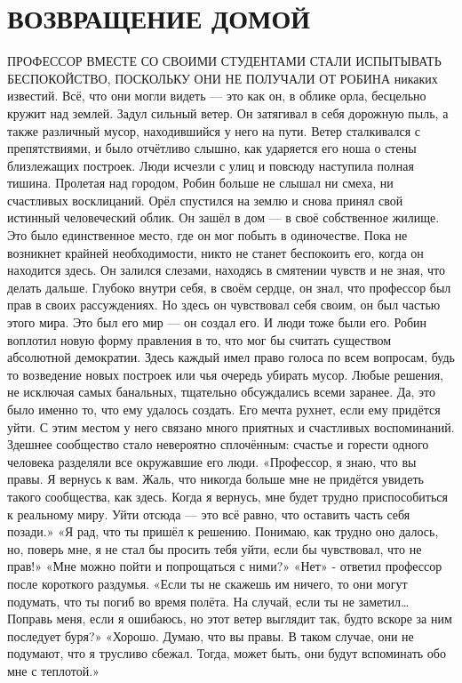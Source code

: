 \documentclass[a4paper,12pt]{book}
\begin{document}
\chapter{ВОЗВРАЩЕНИЕ ДОМОЙ}
	ПРОФЕССОР ВМЕСТЕ СО СВОИМИ СТУДЕНТАМИ СТАЛИ ИСПЫТЫВАТЬ БЕСПОКОЙСТВО, ПОСКОЛЬКУ ОНИ НЕ ПОЛУЧАЛИ ОТ РОБИНА никаких известий. Всё, что они могли видеть — это как он, в облике орла, бесцельно кружит над землей.
	Задул сильный ветер. Он затягивал в себя дорожную пыль, а также различный мусор, находившийся у него на пути. Ветер сталкивался с препятствиями, и было отчётливо слышно, как ударяется его ноша о стены близлежащих построек.
	Люди исчезли с улиц и повсюду наступила полная тишина. Пролетая над городом, Робин больше не слышал ни смеха, ни счастливых восклицаний.
	Орёл спустился на землю и снова принял свой истинный человеческий облик. Он зашёл в дом — в своё собственное жилище. Это было единственное место, где он мог побыть в одиночестве. Пока не возникнет крайней необходимости, никто не станет беспокоить его, когда он находится здесь.
	Он залился слезами, находясь в смятении чувств и не зная, что делать дальше. Глубоко внутри себя, в своём сердце, он знал, что профессор был прав в своих рассуждениях. Но здесь он чувствовал себя своим, он был частью этого мира. Это был его мир — он создал его. И люди тоже были его. Робин воплотил новую форму правления в то, что мог бы считать существом абсолютной демократии. Здесь каждый имел право голоса по всем вопросам, будь то возведение новых построек или чья очередь убирать мусор. Любые решения, не исключая самых банальных, тщательно обсуждались всеми заранее. Да, это было именно то, что ему удалось создать. Его мечта рухнет, если ему придётся уйти.
	С этим местом у него связано много приятных и счастливых воспоминаний. Здешнее сообщество стало невероятно сплочённым: счастье и горести одного человека разделяли все окружавшие его люди.
	«Профессор, я знаю, что вы правы. Я вернусь к вам. Жаль, что никогда больше мне не придётся увидеть такого сообщества, как здесь. Когда я вернусь, мне будет трудно приспособиться к реальному миру. Уйти отсюда — это всё равно, что оставить часть себя позади.»
	«Я рад, что ты пришёл к решению. Понимаю, как трудно оно далось, но, поверь мне, я не стал бы просить тебя уйти, если бы чувствовал, что не прав!»
	«Мне можно пойти и попрощаться с ними?»
	«Нет» - ответил профессор после короткого раздумья.
	«Если ты не скажешь им ничего, то они могут подумать, что ты погиб во время полёта. На случай, если ты не заметил… Поправь меня, если я ошибаюсь, но этот ветер выглядит так, будто вскоре за ним последует буря?»
	«Хорошо. Думаю, что вы правы. В таком случае, они не подумают, что я трусливо сбежал. Тогда, может быть, они будут вспоминать обо мне с теплотой.»	
\end{document}
